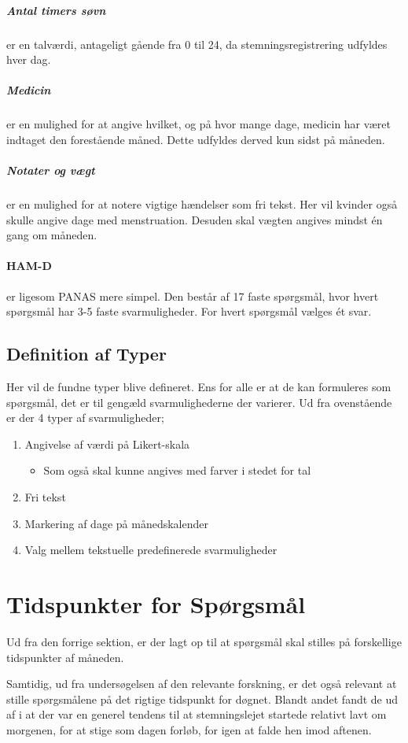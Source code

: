 \subparagraph{Antal timers søvn} er en talværdi, antageligt gående fra 0 til 24, da stemningsregistrering udfyldes hver dag.

\subparagraph{Medicin} er en mulighed for at angive hvilket, og på hvor mange dage, medicin har været indtaget den forestående måned.
Dette udfyldes derved kun sidst på måneden.

\subparagraph{Notater og vægt} er en mulighed for at notere vigtige hændelser som fri tekst.
Her vil kvinder også skulle angive dage med menstruation.
Desuden skal vægten angives mindst én gang om måneden.

\paragraph{HAM-D} er ligesom PANAS mere simpel.
Den består af 17 faste spørgsmål, hvor hvert spørgsmål har 3-5 faste svarmuligheder.
For hvert spørgsmål vælges ét svar.

\subsection{Definition af Typer}
Her vil de fundne typer blive defineret.
Ens for alle er at de kan formuleres som spørgsmål, det er til gengæld svarmulighederne der varierer.
Ud fra ovenstående er der 4 typer af svarmuligheder;

\begin{enumerate}
\item Angivelse af værdi på Likert-skala 
\begin{itemize}
\item Som også skal kunne angives med farver i stedet for tal
\end{itemize}
\item Fri tekst
\item Markering af dage på månedskalender
\item Valg mellem tekstuelle predefinerede svarmuligheder
\end{enumerate}

\section{Tidspunkter for Spørgsmål}
Ud fra den forrige sektion, er der lagt op til at spørgsmål skal stilles på forskellige tidspunkter af måneden.

Samtidig, ud fra undersøgelsen af den relevante forskning, er det også relevant at stille spørgsmålene på det rigtige tidspunkt for døgnet.
Blandt andet fandt de ud af i \citet{PANAS} at der var en generel tendens til at stemningslejet startede relativt lavt om morgenen, for at stige som dagen forløb, for igen at falde hen imod aftenen.

